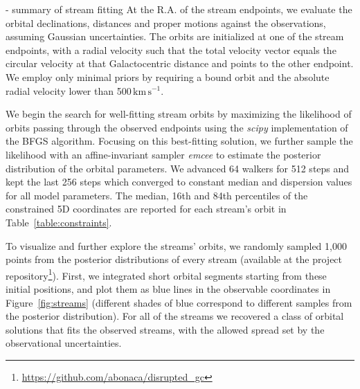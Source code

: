 \documentclass[twocolumn]{aastex63}
\newcommand{\package}[1]{\textsl{#1}}
\newcommand{\kms}{\ensuremath{\textrm{km}\,\textrm{s}^{-1}}}
\begin{document}
- summary of stream fitting
At the R.A. of the stream endpoints, we evaluate the orbital declinations, distances and proper motions against the observations, assuming Gaussian uncertainties.
The orbits are initialized at one of the stream endpoints, with a radial velocity such that the total velocity vector equals the circular velocity at that Galactocentric distance and points to the other endpoint.
We employ only minimal priors by requiring a bound orbit and the absolute radial velocity lower than 500\,\kms.

We begin the search for well-fitting stream orbits by maximizing the likelihood of orbits passing through the observed endpoints using the \package{scipy} implementation of the BFGS algorithm.
Focusing on this best-fitting solution, we further sample the likelihood with an affine-invariant sampler \package{emcee} to estimate the posterior distribution of the orbital parameters.
We advanced 64 walkers for 512 steps and kept the last 256 steps which converged to constant median and dispersion values for all model parameters.
The median, 16th and 84th percentiles of the constrained 5D coordinates are reported for each stream's orbit in Table~\ref{table:constraints}.

To visualize and further explore the streams' orbits, we randomly sampled 1,000 points from the posterior distributions of every stream (available at the project repository\footnote{\url{https://github.com/abonaca/disrupted_gc}}).
First, we integrated short orbital segments starting from these initial positions, and plot them as blue lines in the observable coordinates in Figure~\ref{fig:streams} (different shades of blue correspond to different samples from the posterior distribution).
For all of the streams we recovered a class of orbital solutions that fits the observed streams, with the allowed spread set by the observational uncertainties.
\end{document}
